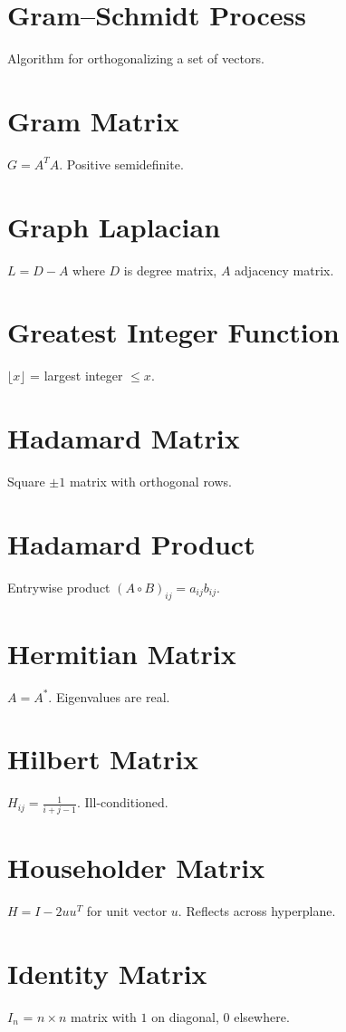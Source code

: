 \documentclass[12pt]{book}
\begin{document}
\chapter{Gram--Schmidt Process}
Algorithm for orthogonalizing a set of vectors.

\chapter{Gram Matrix}
$G = A^T A$. Positive semidefinite.

\chapter{Graph Laplacian}
$L = D - A$ where $D$ is degree matrix, $A$ adjacency matrix.

\chapter{Greatest Integer Function}
$\lfloor x \rfloor$ = largest integer $\leq x$.

\chapter{Hadamard Matrix}
Square $\pm 1$ matrix with orthogonal rows.

\chapter{Hadamard Product}
Entrywise product $(A \circ B)_{ij} = a_{ij} b_{ij}$.

\chapter{Hermitian Matrix}
$A = A^*$. Eigenvalues are real.

\chapter{Hilbert Matrix}
$H_{ij} = \tfrac{1}{i+j-1}$. Ill-conditioned.

\chapter{Householder Matrix}
$H = I - 2uu^T$ for unit vector $u$. Reflects across hyperplane.

\chapter{Identity Matrix}
$I_n$ = $n \times n$ matrix with $1$ on diagonal, $0$ elsewhere.
\end{document}
